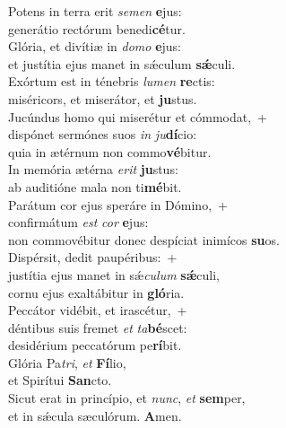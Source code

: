 \evenverse Potens in terra erit \textit{se}\textit{men} \textbf{e}jus:~\*\\
\evenverse generátio rectórum benedi\textbf{cé}tur.\\
\oddverse Glória, et divítiæ in \textit{do}\textit{mo} \textbf{e}jus:~\*\\
\oddverse et justítia ejus manet in sǽculum \textbf{sǽ}culi.\\
\evenverse Exórtum est in ténebris \textit{lu}\textit{men} \textbf{re}ctis:~\*\\
\evenverse miséricors, et miserátor, et \textbf{ju}stus.\\
\oddverse Jucúndus homo qui miserétur et cómmodat,~+\\
\oddverse  dispónet sermónes suos \textit{in} \textit{ju}\textbf{dí}cio:~\*\\
\oddverse quia in ætérnum non commo\textbf{vé}bitur.\\
\evenverse In memória ætérna \textit{e}\textit{rit} \textbf{ju}stus:~\*\\
\evenverse ab auditióne mala non ti\textbf{mé}bit.\\
\oddverse Parátum cor ejus speráre in Dómino,~+\\
\oddverse  confirmátum \textit{est} \textit{cor} \textbf{e}jus:~\*\\
\oddverse non commovébitur donec despíciat inimícos \textbf{su}os.\\
\evenverse Dispérsit, dedit paupéribus:~+\\
\evenverse  justítia ejus manet in sǽ\textit{cu}\textit{lum} \textbf{sǽ}culi,~\*\\
\evenverse cornu ejus exaltábitur in \textbf{gló}ria.\\
\oddverse Peccátor vidébit, et irascétur,~+\\
\oddverse  déntibus suis fremet \textit{et} \textit{ta}\textbf{bé}scet:~\*\\
\oddverse desidérium peccatórum pe\textbf{rí}bit.\\
\evenverse Glória Pa\textit{tri}, \textit{et} \textbf{Fí}lio,~\*\\
\evenverse et Spirítui \textbf{San}cto.\\
\oddverse Sicut erat in princípio, et \textit{nunc}, \textit{et} \textbf{sem}per,~\*\\
\oddverse et in sǽcula sæculórum. \textbf{A}men.\\
